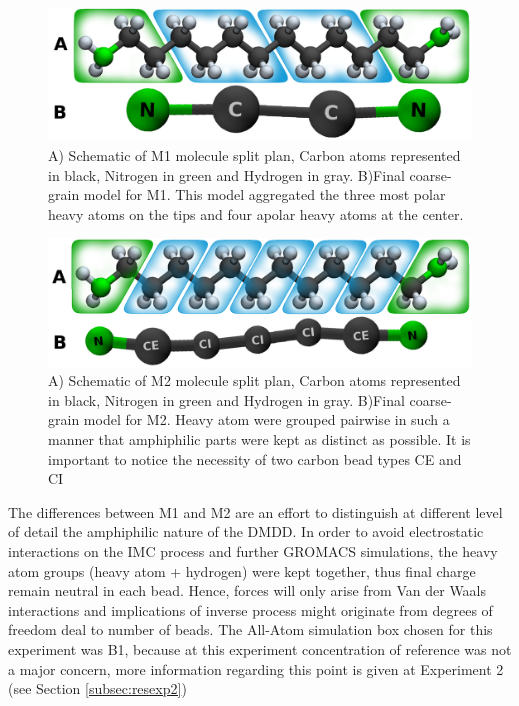 \documentclass[10pt,a4paper,twoside]{article}
\begin{document}
 \begin{figure}[ht]
	\includegraphics[width=1.0 \textwidth]{./images/M1ab}
	\caption{A) Schematic of M1 molecule split plan, Carbon atoms represented in black, Nitrogen in green and Hydrogen in gray. B)Final coarse-grain model for M1. This model aggregated the three most polar heavy atoms on the tips and four apolar heavy atoms at the center.}
	\label{Fig:mol1}
\end{figure}
 \begin{figure}[ht]
	\includegraphics[width=1.0 \textwidth]{./images/M2ab}
	\caption{A) Schematic of M2 molecule split plan, Carbon atoms represented in black, Nitrogen in green and Hydrogen in gray. B)Final coarse-grain model for M2. Heavy atom were grouped pairwise in such a manner that amphiphilic parts were kept as distinct as possible. It is important to notice the necessity of two carbon bead types CE and CI}
		\label{Fig:mol2}
\end{figure}
 
 The differences between M1 and M2 are an effort to distinguish at different level of detail the amphiphilic nature of the DMDD. In order to avoid electrostatic interactions on the IMC process and further GROMACS simulations, the heavy atom groups (heavy atom + hydrogen) were kept together, thus  final charge remain neutral in each bead. Hence, forces will only arise from Van der Waals interactions and implications of inverse process might originate from  degrees of freedom deal to number of beads. The All-Atom simulation box chosen for this experiment was B1, because at this experiment concentration of reference was not a major concern, more information regarding this point is given at Experiment 2 (see Section \ref{subsec:resexp2})
   
\end{document}
